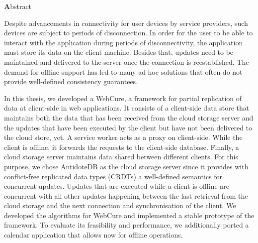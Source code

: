 \begin{center}
{\Large \textbf Abstract}
\end{center}
\vspace{1cm}

Despite advancements in connectivity for user devices by service providers, such devices are subject to periods of disconnection. In order for the user to be able to interact with the application during periods of disconnectivity, the application must store its data on the client machine. Besides that, updates need to be maintained and delivered to the server once the connection is reestablished. The demand for offline support has led to many ad-hoc solutions that often do not provide well-defined consistency guarantees. 

In this thesis, we developed a WebCure, a framework for partial replication of data at client-side in web applications. It consists of a client-side data store that maintains both the data that has been received from the cloud storage server and the updates that have been executed by the client but have not been delivered to the cloud store, yet. A service worker acts as a proxy on client-side. While the client is offline, it forwards the requests to the client-side database. Finally, a cloud storage server maintains data shared between different clients. For this purpose, we chose AntidoteDB as the cloud storage server since it provides with conflict-free replicated data types (CRDTs) a well-defined semantics for concurrent updates. Updates that are executed while a client is offline are concurrent with all other updates happening between the last retrieval from the cloud storage and the next connection and synchronisation of the client. We developed the algorithms for WebCure and implemented a stable prototype of the framework. To evaluate its feasibility and performance, we additionally ported a calendar application that allows now for offline operations.